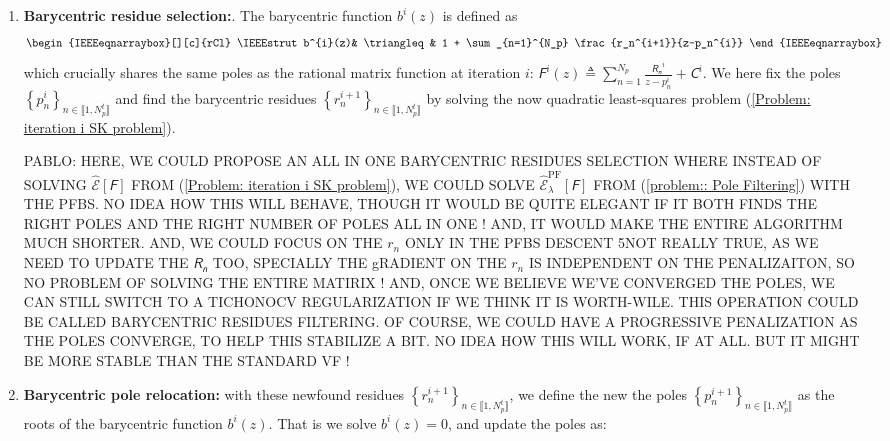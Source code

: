 \documentclass{article}
\newcommand{\mat}[1]{\bm{\mathsfit{#1}}}
\begin{document}
\begin{enumerate}
  \item \textbf{Barycentric residue selection:}. The barycentric function $b^{i}(z)$ is defined as
    \begin{equation}
    \begin{IEEEeqnarraybox}[][c]{rCl}
    \IEEEstrut
    b^{i}(z)& \triangleq & 1 + \sum_{n=1}^{N_p} \frac{r_n^{i+1}}{z-p_n^{i}} 
    \end{IEEEeqnarraybox}
    \label{eq: baricentric function b pole expansion}
    \end{equation}
which crucially shares the same poles as the rational matrix function at iteration $i$: $\mat{F}^{i}(z)  \triangleq \sum_{n=1}^{N_p} \frac{\mat{R_n}^{i}}{z-p_n^{i}} + \mat{C}^{i} $. We here fix the poles $\left\{p_n^{i}\right\}_{n\in \llbracket 1 , N_p^t \rrbracket}$ and find the barycentric residues $\left\{r_n^{i+1}\right\}_{n\in \llbracket 1 , N_p^t \rrbracket}$ by solving the now quadratic least-squares problem (\ref{Problem: iteration i SK problem}).

PABLO: HERE, WE COULD PROPOSE AN ALL IN ONE BARYCENTRIC RESIDUES SELECTION WHERE INSTEAD OF SOLVING $\widehat{\mathcal{E}}\left[\mat{F}\right] $ FROM (\ref{Problem: iteration i SK problem}), WE COULD SOLVE $\widehat{\mathcal{E}}^{\mathrm{PF}}_\lambda \left[\mat{F}\right] $ FROM (\ref{problem:: Pole Filtering}) WITH THE PFBS. NO IDEA HOW THIS WILL BEHAVE, THOUGH IT WOULD BE QUITE ELEGANT IF IT BOTH FINDS THE RIGHT POLES AND THE RIGHT NUMBER OF POLES ALL IN ONE !
AND, IT WOULD MAKE THE ENTIRE ALGORITHM MUCH SHORTER. 
AND, WE COULD FOCUS ON THE $r_n$ ONLY IN THE PFBS DESCENT 5NOT REALLY TRUE, AS WE NEED TO UPDATE THE $\mat{R_n}$ TOO, SPECIALLY THE gRADIENT ON THE $r_n$ IS INDEPENDENT ON THE PENALIZAITON, SO NO PROBLEM OF SOLVING THE ENTIRE MATIRIX ! AND, ONCE WE BELIEVE WE'VE CONVERGED THE POLES, WE CAN STILL SWITCH TO A TICHONOCV REGULARIZATION IF WE THINK IT IS WORTH-WILE. 
THIS OPERATION COULD BE CALLED BARYCENTRIC RESIDUES FILTERING. 
OF COURSE, WE COULD HAVE A PROGRESSIVE PENALIZATION AS THE POLES CONVERGE, TO HELP THIS STABILIZE A BIT. 
NO IDEA HOW THIS WILL WORK, IF AT ALL. BUT IT MIGHT BE MORE STABLE THAN THE STANDARD VF !


  \item \textbf{Barycentric pole relocation:} with these newfound residues $\left\{r_n^{i+1}\right\}_{n\in \llbracket 1 , N_p^t \rrbracket}$, we define the new the poles $\left\{p_n^{i+1}\right\}_{n\in \llbracket 1 , N_p^t \rrbracket}$ as the roots of the barycentric function $b^i(z)$. That is we solve $b^i(z) = 0 $, and update the poles as:


\end{enumerate}
\end{document}
